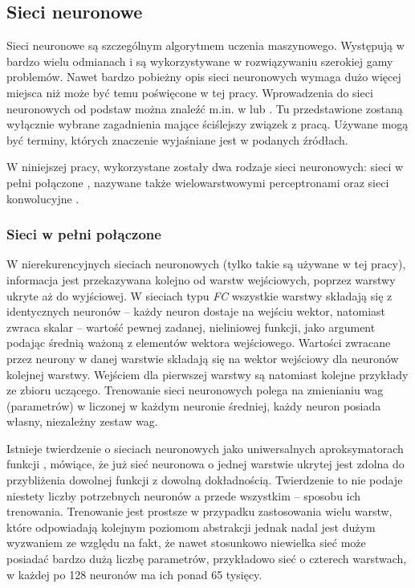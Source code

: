 \subsection{Sieci neuronowe}
\label{subsec:nn}

Sieci neuronowe  są szczególnym algorytmem uczenia maszynowego. Występują w bardzo wielu odmianach i są wykorzystywane w rozwiązywaniu szerokiej gamy problemów. Nawet bardzo pobieżny opis sieci neuronowych wymaga dużo więcej miejsca niż może być temu poświęcone w tej pracy. 
Wprowadzenia do sieci neuronowych od podstaw można znaleźć m.in. w \cite{samarasinghe2016neural} lub \cite{Goodfellow-et-al-2016}. 
Tu przedstawione zostaną wyłącznie wybrane zagadnienia mające ściślejszy związek z pracą. Używane mogą być terminy, których znaczenie wyjaśniane jest w podanych źródłach.

W niniejszej pracy, wykorzystane zostały dwa rodzaje sieci neuronowych: sieci w pełni połączone , nazywane także wielowarstwowymi perceptronami  oraz sieci konwolucyjne . 

\subsubsection*{Sieci w pełni połączone}
W nierekurencyjnych sieciach neuronowych (tylko takie są używane w tej pracy), informacja jest przekazywana kolejno od warstw wejściowych, poprzez warstwy ukryte aż do wyjściowej. 
W sieciach typu \textit{FC} wszystkie warstwy składają się z identycznych neuronów -- każdy neuron dostaje na wejściu wektor, natomiast zwraca skalar -- wartość pewnej zadanej, nieliniowej funkcji, jako argument podając średnią ważoną z elementów wektora wejściowego. Wartości zwracane przez neurony w danej warstwie składają się na wektor wejściowy dla neuronów kolejnej warstwy. Wejściem dla pierwszej warstwy są natomiast kolejne przykłady ze zbioru uczącego. Trenowanie sieci neuronowych polega na zmienianiu wag (parametrów) w liczonej w każdym neuronie średniej, każdy neuron posiada własny, niezależny zestaw wag.

Istnieje twierdzenie o sieciach neuronowych jako uniwersalnych aproksymatorach funkcji  \cite{hornik91}, mówiące, że już sieć neuronowa o jednej warstwie ukrytej jest zdolna do przybliżenia dowolnej funkcji z dowolną dokładnością. Twierdzenie to nie podaje niestety liczby potrzebnych neuronów a przede wszystkim -- sposobu ich trenowania. 
Trenowanie jest prostsze w przypadku zastosowania wielu warstw, które odpowiadają kolejnym poziomom abstrakcji jednak nadal jest dużym wyzwaniem ze względu na fakt, że nawet stosunkowo niewielka sieć może posiadać bardzo dużą liczbę parametrów, przykładowo sieć o czterech warstwach, w każdej po 128 neuronów ma ich ponad 65 tysięcy.


